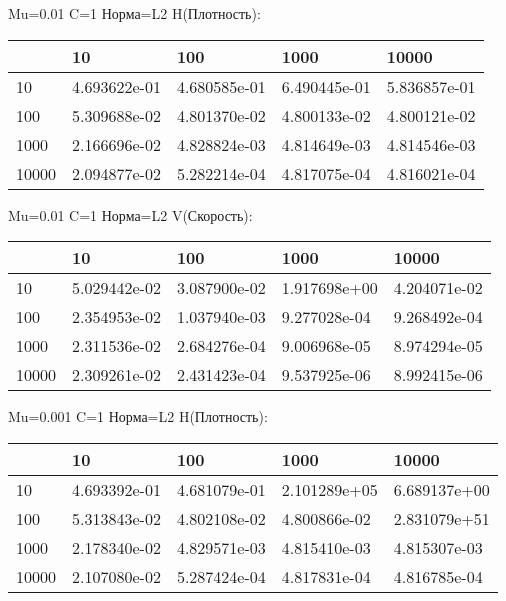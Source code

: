 \documentclass[a4paper, 12pt]{article}
\begin{document}
\bigskip
\bigskip
\bigskip


Mu=0.01  C=1 Норма=L2 H(Плотность):


\begin{tabular}{lllll}
\toprule
{} &         10    &         100   &         1000  &         10000 \\
\midrule
10    &  4.693622e-01 &  4.680585e-01 &  6.490445e-01 &  5.836857e-01 \\
100   &  5.309688e-02 &  4.801370e-02 &  4.800133e-02 &  4.800121e-02 \\
1000  &  2.166696e-02 &  4.828824e-03 &  4.814649e-03 &  4.814546e-03 \\
10000 &  2.094877e-02 &  5.282214e-04 &  4.817075e-04 &  4.816021e-04 \\
\bottomrule
\end{tabular}



\bigskip
\bigskip
\bigskip


Mu=0.01  C=1 Норма=L2 V(Скорость):


\begin{tabular}{lllll}
\toprule
{} &         10    &         100   &         1000  &         10000 \\
\midrule
10    &  5.029442e-02 &  3.087900e-02 &  1.917698e+00 &  4.204071e-02 \\
100   &  2.354953e-02 &  1.037940e-03 &  9.277028e-04 &  9.268492e-04 \\
1000  &  2.311536e-02 &  2.684276e-04 &  9.006968e-05 &  8.974294e-05 \\
10000 &  2.309261e-02 &  2.431423e-04 &  9.537925e-06 &  8.992415e-06 \\
\bottomrule
\end{tabular}



\bigskip
\bigskip
\bigskip


Mu=0.001  C=1 Норма=L2 H(Плотность):


\begin{tabular}{lllll}
\toprule
{} &         10    &         100   &         1000  &         10000 \\
\midrule
10    &  4.693392e-01 &  4.681079e-01 &  2.101289e+05 &  6.689137e+00 \\
100   &  5.313843e-02 &  4.802108e-02 &  4.800866e-02 &  2.831079e+51 \\
1000  &  2.178340e-02 &  4.829571e-03 &  4.815410e-03 &  4.815307e-03 \\
10000 &  2.107080e-02 &  5.287424e-04 &  4.817831e-04 &  4.816785e-04 \\
\bottomrule
\end{tabular}
\end{document}

